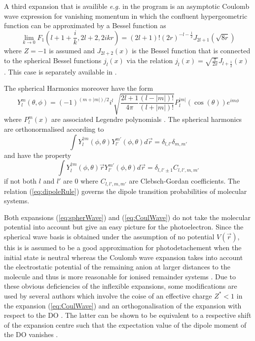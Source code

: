 A third expansion that is availible \textit{e.g.} in the program  \cite{ezDyson} is an asymptotic Coulomb wave expression for vanishing momentum in which the confluent hypergeometric function can be approximated by a Bessel function as
\begin{equation}
\lim_{k\rightarrow 0} F_1(l+1+\frac{i}{k}, 2l+2, 2ikr) =(2l+1)! (2r)^{-l-\frac 12} J_{2l+1}(\sqrt{8r})
\end{equation}
where $Z=-1$ is assumed and $J_{2l+2}(x)$ is the Bessel function that is connected to the spherical Bessel functions $j_l(x)$ via the relation $j_l(x)=\sqrt{\frac{\pi}{2x}} J_{l+\frac 12}(x)$ \cite{Lifschitz}.
This case is separately available in  \cite{ezDyson}.

The spherical Harmonics moreover have the form
\begin{equation}\label{eq:SphHarm}
Y_l^m(\theta,\phi)= (-1)^{(m+|m|)/2} i^l \sqrt{\frac{2l+1}{4\pi}\frac{(l-|m|)!}{(l+|m|)!}}  P_l^{|m|}(\cos(\theta)) e^{im\phi}
\end{equation}
where $P_l^m(x)$ are associated Legendre polynomials \cite{Lifschitz}.
The spherical harmonics are orthonormalised according to
\begin{equation}
\int Y_l^{\dagger m}(\phi,\theta)  Y_{l'}^{m'}(\phi,\theta) d\vec{r}=\delta_{l,l'} \delta_{m,m'}
\end{equation}
and have the property
\begin{equation} \label{eq:dipoleRule}
\int Y_l^{\dagger m}(\phi,\theta) \vec{r} Y_{l'}^{m'}(\phi,\theta) d\vec{r}=\delta_{l,l'\pm 1} C_{l,l', m,m'}
\end{equation}
if not both $l$ and $l'$ are $0$ where $C_{l,l',m,m'}$ are Clebsch-Gordan coefficients.
The relation  (\ref{eq:dipoleRule}) governs the dipole transition probabilities of molecular systems.

Both expansions (\ref{eq:spherWave}) and (\ref{eq:CoulWave}) do not take the molecular potential into account but give an easy picture for the photoelectron.
Since the spherical wave basis is obtained under the assumption of no potential $V(\vec{r})$, this is is assumed to be a good approximation for photodetachement when the initial state is neutral whereas the Coulomb wave expansion takes into account the electrostatic potential of the remaining anion at larger distances to the molecule and thus is more reasonable for ionised remainder systems \cite{do_modCoul}.
Due to these obvious deficiencies of the inflexible expansions, some modifications are used by several authors which involve the coise of an effective charge $Z^*<1$ in the expansion (\ref{eq:CoulWave}) \cite{do_modCoul} and an orthogonalisation of the expansion with respect to the DO \cite{do_modCoul,do_orthonorm,do_orthonorm1,do_pworth}.
The latter can be shown to be equivalent to a respective shift of the expansion centre such that the expectation value of the dipole moment of the DO vanishes \cite{do_orthonorm}.

